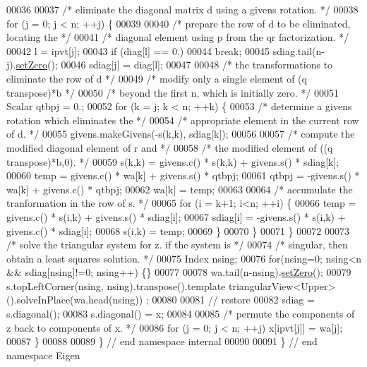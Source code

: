 \begin{DoxyCode}
00036 
00037     \textcolor{comment}{/*     eliminate the diagonal matrix d using a givens rotation. */}
00038     \textcolor{keywordflow}{for} (j = 0; j < n; ++j) \{
00039 
00040         \textcolor{comment}{/*        prepare the row of d to be eliminated, locating the */}
00041         \textcolor{comment}{/*        diagonal element using p from the qr factorization. */}
00042         l = ipvt[j];
00043         \textcolor{keywordflow}{if} (diag[l] == 0.)
00044             \textcolor{keywordflow}{break};
00045         sdiag.tail(n-j).\hyperlink{class_eigen_1_1_plain_object_base_ac21ad5f989f320e46958b75ac8d9a1da}{setZero}();
00046         sdiag[j] = diag[l];
00047 
00048         \textcolor{comment}{/*        the transformations to eliminate the row of d */}
00049         \textcolor{comment}{/*        modify only a single element of (q transpose)*b */}
00050         \textcolor{comment}{/*        beyond the first n, which is initially zero. */}
00051         Scalar qtbpj = 0.;
00052         \textcolor{keywordflow}{for} (k = j; k < n; ++k) \{
00053             \textcolor{comment}{/*           determine a givens rotation which eliminates the */}
00054             \textcolor{comment}{/*           appropriate element in the current row of d. */}
00055             givens.makeGivens(-s(k,k), sdiag[k]);
00056 
00057             \textcolor{comment}{/*           compute the modified diagonal element of r and */}
00058             \textcolor{comment}{/*           the modified element of ((q transpose)*b,0). */}
00059             s(k,k) = givens.c() * s(k,k) + givens.s() * sdiag[k];
00060             temp = givens.c() * wa[k] + givens.s() * qtbpj;
00061             qtbpj = -givens.s() * wa[k] + givens.c() * qtbpj;
00062             wa[k] = temp;
00063 
00064             \textcolor{comment}{/*           accumulate the tranformation in the row of s. */}
00065             \textcolor{keywordflow}{for} (i = k+1; i<n; ++i) \{
00066                 temp = givens.c() * s(i,k) + givens.s() * sdiag[i];
00067                 sdiag[i] = -givens.s() * s(i,k) + givens.c() * sdiag[i];
00068                 s(i,k) = temp;
00069             \}
00070         \}
00071     \}
00072 
00073     \textcolor{comment}{/*     solve the triangular system for z. if the system is */}
00074     \textcolor{comment}{/*     singular, then obtain a least squares solution. */}
00075     Index nsing;
00076     \textcolor{keywordflow}{for}(nsing=0; nsing<n && sdiag[nsing]!=0; nsing++) \{\}
00077 
00078     wa.tail(n-nsing).\hyperlink{class_eigen_1_1_plain_object_base_ac21ad5f989f320e46958b75ac8d9a1da}{setZero}();
00079     s.topLeftCorner(nsing, nsing).transpose().template triangularView<Upper>().solveInPlace(wa.head(nsing))
      ;
00080 
00081     \textcolor{comment}{// restore}
00082     sdiag = s.diagonal();
00083     s.diagonal() = x;
00084 
00085     \textcolor{comment}{/*     permute the components of z back to components of x. */}
00086     \textcolor{keywordflow}{for} (j = 0; j < n; ++j) x[ipvt[j]] = wa[j];
00087 \}
00088 
00089 \} \textcolor{comment}{// end namespace internal}
00090 
00091 \} \textcolor{comment}{// end namespace Eigen}
\end{DoxyCode}
